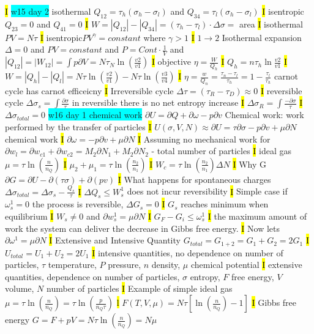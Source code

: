 \documentclass[fontsize=4pt]{scrartcl}
\begin{document}
\hl{I}
\colorbox{Cyan}{w15 day 2}
isothermal $Q_{12} = \tau_{h}(\sigma_h -\sigma_l)$ and $Q_{34} = \tau_{l}(\sigma_h -\sigma_l)$
\hl{I}
isentropic $Q_{23} = 0$ and $Q_{41} = 0$ 
\hl{I}
$W=|Q_{12}| - |Q_{34}| = (\tau_h - \tau_{l}) \cdot \Delta \sigma = $ area
\hl{I}
isothermal $PV = N\tau$
\hl{I}
isentropic$P V^{\gamma} = constant$ where $ \gamma >1$
\hl{I}
$1 \rightarrow 2$ Isothermal expansion $\Delta = 0$ and $PV = constant$ and $P=Cont \cdot \frac{1}{V}$
and $|Q_{12}| = |W_{12}| = \int p \partial V = N \tau_N \ln(\frac{v2}{v1})$
\hl{I}
objective $\eta = \frac{W}{Q_h}$
\hl{I}
$Q_h = n \tau_h \ln \frac{v2}{v1}$
\hl{I}
$W = |Q_h|-|Q_l| = N \tau \ln(\frac{v2}{v1}) - N \tau \ln(\frac{v3}{v4})  $
\hl{I}
$\eta = \frac{w}{Q_n} = \frac{\tau_n - \tau_{l}}{\tau_h} = 1 - \frac{\tau_l}{\tau_h}$ carnot cycle has carnot efficeicny
\hl{I}
Irreversible cycle $\Delta \tau = (\tau_R - \tau_D) \approx 0$
\hl{I}
reversible cycle $\Delta \sigma_s = \int \frac{\partial \sigma}{\tau}$ in reversible there is no net entropy increase
\hl{I}
$\Delta \sigma_R = \int \frac{- \partial \sigma}{\tau}$
\hl{I}
$\Delta \sigma_{total} =0$
\colorbox{Cyan}{w16 day 1 chemical work}
$\partial U = \partial Q + \partial \omega - p \partial v$
Chemical work: work performed by the transfer of particles
\hl{I}
$U(\sigma, V,N) \approx \partial U = \tau \partial \sigma - p \partial v + \mu \partial N$ chemical work
\hl{I}
$\partial \omega = -p \partial v + \mu \partial N$
\hl{I}
Assuming no mechanical work for
$\partial w_{l} = \partial w_{c1} + \partial w_{c2} = M_2 \partial N_1 + M_2 \partial N_2$ - total number of particles
\hl{I}
ideal gas $\mu = \tau \ln(\frac{n}{n_Q})$
\hl{I}
$\mu_2 + \mu_1 = \tau \ln(\frac{n_2}{n_1})$
\hl{I}
$W_c = \tau \ln (\frac{n_2}{n_1})\Delta N$
\hl{I}
Why G $\partial G = \partial U - \partial(\tau \sigma) + \partial(pv)$
\hl{I}
What happens for spontaneous charges
$\Delta \sigma_{total} = \Delta \sigma_s - \frac{Q_s}{\tau}$
\hl{I}
$\Delta Q_s \leq W_s^1$ does not incur reversibility
\hl{I}
Simple case if $\omega_s^1 = 0$ the process is reversible, $\Delta G_s = 0$ 
\hl{I}
$G_s$ reaches minimum when equilibrium 
\hl{I}
$W_s \neq 0$ and $\partial w_s^1 = \mu \partial N$
\hl{I}
$G_F - G_i \leq \omega_s^1$
\hl{I}
the maximum amount of work the system can deliver the decrease in Gibbs free energy. 
\hl{I}
Now lets $\partial \omega^1 = \mu \partial N$
\hl{I}
Extensive and Intensive Quantity
$G_{total} = G_{1+2}=G_1 + G_2 = 2G_1$
\hl{I}
$U_{total} = U_1 + U_2 = 2U_1$
\hl{I}
intensive quantities, no dependence on number of particles, $\tau$ temperature, $P$ pressure, $n$ density, $\mu$ chemical potential
\hl{I}
extensive quantities, dependence on number of particles, $\sigma$ entropy, $F$ free energy, $V$ volume, $N$ number of particles
\hl{I}
 Example of simple ideal gas $\mu = \tau \ln (\frac{n}{n_Q}) = \tau \ln (\frac{p}{n_Q \tau})$
 \hl{l}
 $F(T,V,\mu) = N\tau [\ln (\frac{n}{n_Q})-1]$
 \hl{I}
 Gibbs free energy $G=F+pV=N \tau \ln (\frac{n}{n_Q}) = N \mu$
\end{document}
